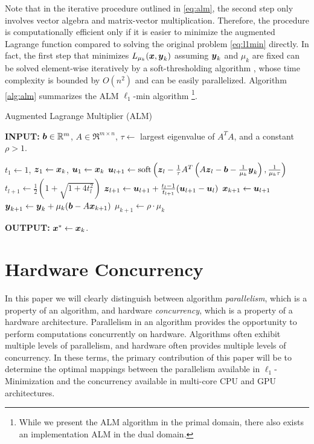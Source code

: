\documentclass[10pt,twocolumn,letterpaper]{article}
\begin{document}
Note that in the iterative procedure outlined in \eqref{eq:alm}, the second
step only involves vector algebra and matrix-vector multiplication. Therefore,
the procedure is computationally efficient only if it is easier to minimize the
augmented Lagrange function compared to solving the original problem
\eqref{eq:l1min} directly. In fact, the first step that minimizes $L_{\mu_k}
({\boldsymbol{x}},{\boldsymbol{y}}_k)$ assuming ${\boldsymbol{y}}_k$ and $\mu_k$ are fixed can be solved element-wise
iteratively by a soft-thresholding algorithm \cite{WrightS2008,BeckA2009},
whose time complexity is bounded by $O(n^2)$ and can be easily parallelized.
Algorithm \eqref{alg:alm} summarizes the ALM $\ell_1$-min algorithm \footnote{While we
present the ALM algorithm in the primal domain, there also
exists an implementation ALM in the dual domain.}.

 \begin{algorithm}[h]
\caption{Augmented Lagrange Multiplier (ALM)}
{\bf INPUT:} ${\boldsymbol{b}} \in {\mathbb{R}}^m$, $A \in \Re^{m \times n}$, $\tau\leftarrow$ largest eigenvalue of $A^TA$, and a constant $\rho>1$.
\begin{algorithmic}[1]
 \STATE $t_1 \leftarrow 1$, ${\boldsymbol{z}}_1
\leftarrow {\boldsymbol{x}}_k$, ${\boldsymbol{u}}_1 \leftarrow {\boldsymbol{x}}_k$  \STATE ${\boldsymbol{u}}_{l+1}  \leftarrow
\mathrm{soft}\left({\boldsymbol{z}}_l - \frac{1}{\tau}A^T\left(A{\boldsymbol{z}}_l - {\boldsymbol{b}}
- \frac{1}{\mu_k}{\boldsymbol{y}}_k\right), \frac{1}{\mu_k\tau}\right)$
\STATE $t_{l+1} \leftarrow \frac{1}{2}\left( 1 +
\sqrt{1+4t_l^2}\right)$ \STATE ${\boldsymbol{z}}_{l+1} \leftarrow {\boldsymbol{u}}_{l+1}
+ \frac{t_l - 1}{t_{l+1}}({\boldsymbol{u}}_{l+1} - {\boldsymbol{u}}_l)$ \ENDWHILE \STATE$
{\boldsymbol{x}}_{k+1} \leftarrow {\boldsymbol{u}}_{l+1}$ \STATE ${\boldsymbol{y}}_{k+1} \leftarrow
{\boldsymbol{y}}_k + \mu_k ({\boldsymbol{b}} - A{\boldsymbol{x}}_{k+1})$ \STATE $\mu_{k+1} \leftarrow
\rho\cdot\mu_k$ \ENDWHILE 
\end{algorithmic}

{\bf OUTPUT:} ${\boldsymbol{x}}^* \leftarrow {\boldsymbol{x}}_k$.
\label{alg:alm}
\end{algorithm}

\section{Hardware Concurrency} \label{sec:parallelism} 

In this paper we will clearly distinguish between algorithm {\em parallelism},
which is a property of an algorithm, and hardware {\em concurrency}, which is a
property of a hardware architecture.  Parallelism in an algorithm provides the
opportunity to perform computations concurrently on hardware.  Algorithms often
exhibit multiple levels of parallelism, and hardware often provides multiple
levels of concurrency.  In these terms, the primary contribution of this paper
will be to determine the optimal mappings between the parallelism available in
$\ell_1$-Minimization and the concurrency available in multi-core CPU and GPU
architectures.
\end{document}
